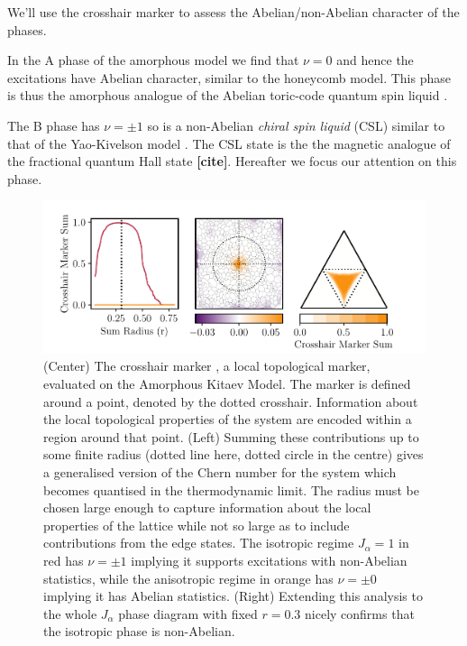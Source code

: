 We'll use the crosshair marker to assess the Abelian/non-Abelian character of the phases.

In the A phase of the amorphous model we find that \(\nu=0\) and hence the excitations have Abelian character, similar to the honeycomb model. This phase is thus the amorphous analogue of the Abelian toric-code quantum spin liquid \autocite{kitaev_fault-tolerant_2003}.

The B phase has \(\nu=\pm1\) so is a non-Abelian \emph{chiral spin liquid} (CSL) similar to that of the Yao-Kivelson model \autocite{yaoExactChiralSpin2007}. The CSL state is the the magnetic analogue of the fractional quantum Hall state \textbf{{[}cite{]}}. Hereafter we focus our attention on this phase.

\hypertarget{fig:phase_diagram_chern}{%
\begin{figure}
\centering
\includegraphics[width=1\textwidth,height=\textheight]{figure_code/amk_chapter/results/phase_diagram_chern/phase_diagram_chern}
\caption[{Local Chern Markers}]{(Center) The crosshair marker \autocite{peru_preprint}, a local topological marker, evaluated on the Amorphous Kitaev Model. The marker is defined around a point, denoted by the dotted crosshair. Information about the local topological properties of the system are encoded within a region around that point. (Left) Summing these contributions up to some finite radius (dotted line here, dotted circle in the centre) gives a generalised version of the Chern number for the system which becomes quantised in the thermodynamic limit. The radius must be chosen large enough to capture information about the local properties of the lattice while not so large as to include contributions from the edge states. The isotropic regime \(J_\alpha = 1\) in red has \(\nu = \pm 1\) implying it supports excitations with non-Abelian statistics, while the anisotropic regime in orange has \(\nu = \pm 0\) implying it has Abelian statistics. (Right) Extending this analysis to the whole \(J_\alpha\) phase diagram with fixed \(r = 0.3\) nicely confirms that the isotropic phase is non-Abelian.}
\label{fig:phase_diagram_chern}
\end{figure}
}

